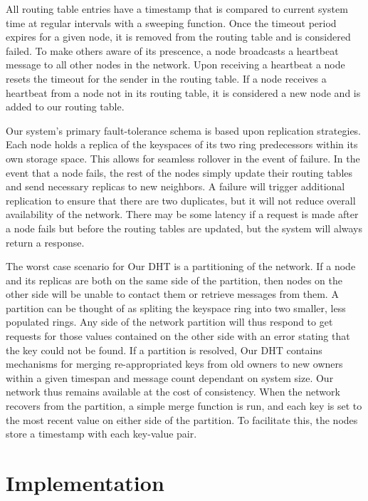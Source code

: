 \documentclass[11pt]{article}
\begin{document}
All routing table entries have a timestamp that is compared to current system time at regular intervals with a sweeping function. Once the timeout period expires for a given node, it is removed from the routing table and is considered failed. To make others aware of its prescence, a node broadcasts a heartbeat message to all other nodes in the network. Upon receiving a heartbeat a node resets the timeout for the sender in the routing table. If a node receives a heartbeat from a node not in its routing table, it is considered a new node and is added to our routing table. 

Our system's primary fault-tolerance schema is based upon replication strategies. Each node holds a replica of the keyspaces of its two ring predecessors within its own storage space. This allows for seamless rollover in the event of failure. In the event that a node fails, the rest of the nodes simply update their routing tables and send necessary replicas to new neighbors. A failure will trigger additional replication to ensure that there are two duplicates, but it will not reduce overall availability of the network. There may be some latency if a request is made after a node fails but before the routing tables are updated, but the system will always return a response.

The worst case scenario for Our DHT is a partitioning of the network. If a node and its replicas are both on the same side of the partition, then nodes on the other side will be unable to contact them or retrieve messages from them. A partition can be thought of as spliting the keyspace ring into two smaller, less populated rings. Any side of the network partition will thus respond to get requests for those values contained on the other side with an error stating that the key could not be found. If a partition is resolved, Our DHT contains mechanisms for merging re-appropriated keys from old owners to new owners within a given timespan and message count dependant on system size. Our network thus remains available at the cost of consistency. When the network recovers from the partition, a simple merge function is run, and each key is set to the most recent value on either side of the partition. To facilitate this, the nodes store a timestamp with each key-value pair.

\section{Implementation}\label{sec:imple}
\end{document}
